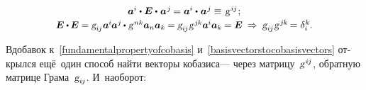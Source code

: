 \begin{otherlanguage}{russian}
\begin{equation}
\begin{array}{c}
\bm{a}^{\hspace{-0.05ex}i} \dotp \bm{E} \dotp \hspace{0.1ex} \bm{a}^{\hspace{0.1ex}j} \hspace{-0.15ex} = \bm{a}^{\hspace{-0.05ex}i} \dotp \hspace{0.1ex} \bm{a}^{\hspace{0.1ex}j} \hspace{-0.15ex} \hspace{0.1ex} \equiv \hspace{0.16ex} \textsl{g}^{\hspace{0.2ex}i\hspace{-0.1ex}j} \hspace{0.1ex} ; \\[0.2em]
%
\scalebox{0.96}[0.97]{$\bm{E} \dotp \hspace{-0.1ex} \bm{E} = \textsl{g}_{i\hspace{-0.1ex}j} \hspace{0.1ex} \bm{a}^{\hspace{-0.05ex}i} \hspace{-0.1ex} \bm{a}^{\hspace{0.05ex}j} \hspace{-0.1ex} \dotp \hspace{0.1ex} \textsl{g}^{\hspace{0.2ex}nk} \bm{a}_n \bm{a}_k \hspace{-0.1ex} = \textsl{g}_{i\hspace{-0.1ex}j} \hspace{0.1ex} \textsl{g}^{\hspace{0.2ex}j\hspace{-0.1ex}k} \bm{a}^{\hspace{-0.05ex}i} \bm{a}_k \hspace{-0.1ex} = \bm{E}$}
\:\Rightarrow\: \textsl{g}_{i\hspace{-0.1ex}j} \hspace{0.1ex} \textsl{g}^{\hspace{.2ex}j\hspace{-0.1ex}k} \hspace{-0.25ex} = \delta_i^{\hspace{0.05ex}k} \hspace{-0.1ex}.
\end{array}\end{equation}

\vspace{0.1em}\noindent Вдобавок к~\eqref{fundamentalpropertyofcobasis} и~\eqref{basisvectorstocobasisvectors} открылся ещё~один способ найти векторы кобазиса\:--- через матрицу~\hbox{$\textsl{g}^{\hspace{.2ex}i\hspace{-0.1ex}j}$\hspace{-0.3ex}}, обратную матрице Грама~${\textsl{g}_{i\hspace{-0.1ex}j}}$. И~наоборот:


\end{otherlanguage}
